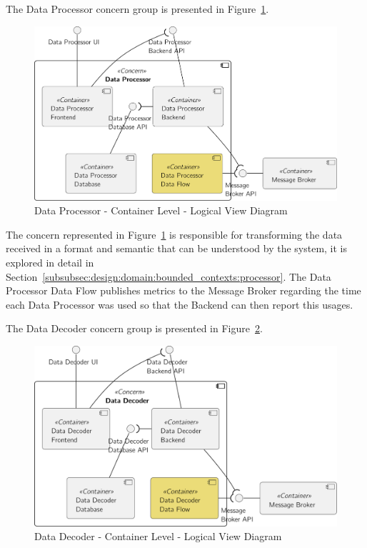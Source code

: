 The Data Processor concern group is presented in Figure~\ref{fig:design:architecture:platform:containers:logical:processor}.

\begin{figure}[H]
   \centering
   \includegraphics[page=1,width=0.8\columnwidth]{assets/diagrams/design/architectural/level2/logical/data-processor-context.pdf}
   \caption[Data Processor - Container Level - Logical View Diagram]{Data Processor - Container Level - Logical View Diagram}
   \label{fig:design:architecture:platform:containers:logical:processor}
\end{figure}

The concern represented in Figure~\ref{fig:design:architecture:platform:containers:logical:processor} is responsible for transforming the data received in a format and semantic that can be understood by the system, it is explored in detail in Section~\ref{subsubsec:design:domain:bounded_contexts:processor}. The Data Processor Data Flow publishes metrics to the Message Broker regarding the time each Data Processor was used so that the Backend can then report this usages.

The Data Decoder concern group is presented in Figure~\ref{fig:design:architecture:platform:containers:logical:decoder}.

\begin{figure}[H]
   \centering
   \includegraphics[page=1,width=0.8\columnwidth]{assets/diagrams/design/architectural/level2/logical/data-decoder-context.pdf}
   \caption[Data Decoder - Container Level - Logical View Diagram]{Data Decoder - Container Level - Logical View Diagram}
   \label{fig:design:architecture:platform:containers:logical:decoder}
\end{figure}

